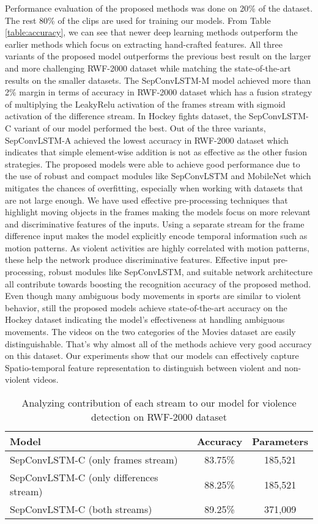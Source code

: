 \documentclass[conference]{IEEEtran}
\begin{document}
Performance evaluation of the proposed methods was done on 20\% of the dataset. The rest 80\% of the clips are used for training our models. From Table \ref{table:accuracy}, we can see that newer deep learning methods outperform the earlier methods which focus on extracting hand-crafted features. All three variants of the proposed model outperforms the previous best result on the larger and more challenging  RWF-2000 dataset while matching the state-of-the-art results on the smaller datasets. The SepConvLSTM-M model achieved more than 2\%  margin in terms of accuracy in RWF-2000 dataset which has a fusion strategy of multiplying the LeakyRelu activation of the frames stream with sigmoid activation of the difference stream. In Hockey fights dataset, the SepConvLSTM-C variant of our model performed the best. Out of the three variants, SepConvLSTM-A achieved the lowest accuracy in RWF-2000 dataset which indicates that simple element-wise addition is not as effective as the other fusion strategies. The proposed models were able to achieve good performance due to the use of robust and compact modules like SepConvLSTM and MobileNet which mitigates the chances of overfitting, especially when working with datasets that are not large enough. We have used effective pre-processing techniques that highlight moving objects in the frames making the models focus on more relevant and discriminative features of the inputs. Using a separate stream for the frame difference input makes the model explicitly encode temporal information such as motion patterns. As violent activities are highly correlated with motion patterns, these help the network produce discriminative features. Effective input pre-processing, robust modules like SepConvLSTM, and suitable network architecture all contribute towards boosting the recognition accuracy of the proposed method. Even though many ambiguous body movements in sports are similar to violent behavior, still the proposed models achieve state-of-the-art accuracy on the Hockey dataset indicating the model's effectiveness at handling ambiguous movements. The videos on the two categories of the Movies dataset are easily distinguishable. That's why almost all of the methods achieve very good accuracy on this dataset. Our experiments show that our models can effectively capture Spatio-temporal feature representation to distinguish between violent and non-violent videos.


\begin{table}[t]
\centering
\caption{Analyzing contribution of each stream to our model for violence detection on RWF-2000 dataset}
\label{table:1stream2stream}
\begin{tabular}{lcc}
\hline
\textbf{Model}                  & \textbf{Accuracy} & \textbf{Parameters}  \\ \hline
SepConvLSTM-C (only frames stream)        & 83.75\%           & 185,521             \\
SepConvLSTM-C (only differences stream)   & 88.25\%           & 185,521             \\
SepConvLSTM-C (both streams)       & 89.25\%           & 371,009             \\ \hline
\end{tabular}
\end{table}
\end{document}
